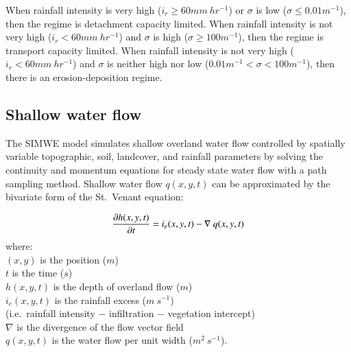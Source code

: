 \documentclass[final,3p,times,twocolumn]{elsarticle}
\begin{document}
%

When rainfall intensity is very high ($i_r \geq 60 mm~hr^{-1}$)
or $\sigma$ is low ($\sigma \leq 0.01 m^{-1}$),
then the regime is detachment capacity limited. 
%
When rainfall intensity is not very high ($i_r < 60 mm~hr^{-1} $)
and $\sigma$ is high ($\sigma \geq 100 m^{-1}$),
then the regime is transport capacity limited. 
%
When rainfall intensity is not very high ($i_r<60 mm~hr^{-1}$)
and $\sigma$ is neither high nor low ($ 0.01 m^{-1}< \sigma < 100 m^{-1}$),
then there is an erosion-deposition regime. \\

\subsection{Shallow water flow}
The SIMWE model
simulates shallow overland water flow 
controlled by spatially variable topographic, soil, landcover, and rainfall parameters
by solving the continuity and momentum equations 
for steady state water flow with a path sampling method. 
Shallow water flow $q(x,y,t)$ can be approximated by
the bivariate form of the St.~Venant equation:

\begin{equation}
\label{eq:water}
{\partial h(x,y,t) \over \partial t} =
 i_e(x,y,t) - \nabla ~ q(x,y,t)
\end{equation}
%
{\small
\noindent
where: \\
\noindent
\hspace*{0.5em} $(x,y)$ is the position ($m$)\\
\hspace*{0.5em} $t$ is the time ($s$) \\
\hspace*{0.5em} $h(x,y,t)$ is the depth of overland flow ($m$)\\
\hspace*{0.5em} $i_e(x,y,t)$ is the rainfall excess ($m~s^{-1}$) \\
\hspace*{0.5em} (i.e.~rainfall intensity $-$ infiltration $-$ vegetation intercept)\\
\hspace*{0.5em} $\nabla$ is the divergence of the flow vector field\\
\hspace*{0.5em} $q(x,y,t)$ is the water flow per unit width ($m^2~s^{-1}$). \\
}
\end{document}
